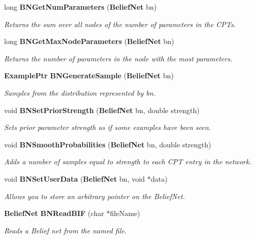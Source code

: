 \begin{CompactItemize}
long {\bf BNGet\-Num\-Parameters} ({\bf Belief\-Net} bn)
\begin{CompactList}\small\item\em Returns the sum over all nodes of the number of parameters in the CPTs. \item\end{CompactList}\item 
long {\bf BNGet\-Max\-Node\-Parameters} ({\bf Belief\-Net} bn)
\begin{CompactList}\small\item\em Returns the number of parameters in the node with the most parameters. \item\end{CompactList}\item 
{\bf Example\-Ptr} {\bf BNGenerate\-Sample} ({\bf Belief\-Net} bn)
\begin{CompactList}\small\item\em Samples from the distribution represented by bn. \item\end{CompactList}\item 
void {\bf BNSet\-Prior\-Strength} ({\bf Belief\-Net} bn, double strength)
\begin{CompactList}\small\item\em Sets prior parameter strength as if some examples have been seen. \item\end{CompactList}\item 
void {\bf BNSmooth\-Probabilities} ({\bf Belief\-Net} bn, double strength)
\begin{CompactList}\small\item\em Adds a number of samples equal to strength to each CPT entry in the network. \item\end{CompactList}\item 
void {\bf BNSet\-User\-Data} ({\bf Belief\-Net} bn, void $\ast$data)
\begin{CompactList}\small\item\em Allows you to store an arbitrary pointer on the Belief\-Net. \item\end{CompactList}\item 
{\bf Belief\-Net} {\bf BNRead\-BIF} (char $\ast$file\-Name)
\begin{CompactList}\small\item\em Reads a Belief net from the named file. \item\end{CompactList}\item 

\end{CompactItemize}
